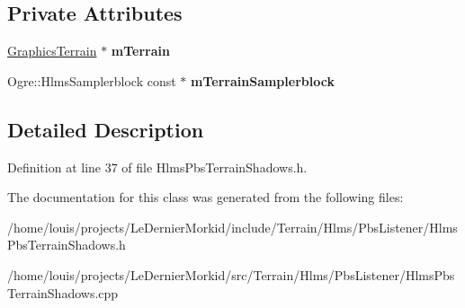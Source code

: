 \subsection*{Private Attributes}
\begin{DoxyCompactItemize}
\item 
\mbox{\label{class_hlms_pbs_terrain_shadows_a7909859bf6e97ff16a4e1aba7df40cdd}} 
\hyperlink{class_graphics_terrain}{Graphics\+Terrain} $\ast$ {\bfseries m\+Terrain}
\item 
\mbox{\label{class_hlms_pbs_terrain_shadows_a4fc80849ecab52b270f092942b56653b}} 
Ogre\+::\+Hlms\+Samplerblock const  $\ast$ {\bfseries m\+Terrain\+Samplerblock}
\end{DoxyCompactItemize}


\subsection{Detailed Description}


Definition at line 37 of file Hlms\+Pbs\+Terrain\+Shadows.\+h.



The documentation for this class was generated from the following files\+:\begin{DoxyCompactItemize}
\item 
/home/louis/projects/\+Le\+Dernier\+Morkid/include/\+Terrain/\+Hlms/\+Pbs\+Listener/Hlms\+Pbs\+Terrain\+Shadows.\+h\item 
/home/louis/projects/\+Le\+Dernier\+Morkid/src/\+Terrain/\+Hlms/\+Pbs\+Listener/Hlms\+Pbs\+Terrain\+Shadows.\+cpp\end{DoxyCompactItemize}
